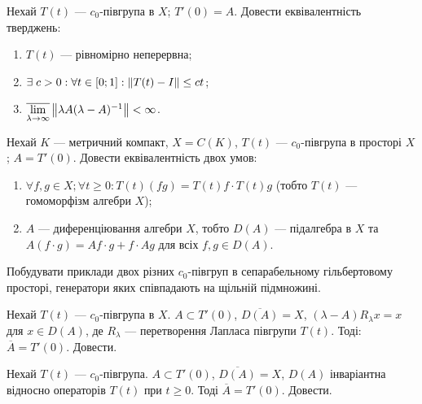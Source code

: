 
\begin{exercise}
    Нехай $T(t)$ --- $c_0$-півгрупа в $X$; $T'(0) = A$. Довести еквівалентність тверджень:
    \begin{enumerate}
        \item $T(t)$ --- рівномірно неперервна;
        \item $\exists \; c > 0: \forall t \in [0; 1]: \left\lVert T(t) - I\right\rVert \leq ct$;
        \item $\overline{\lim\limits_{\lambda \rightarrow \infty}} \left\lVert\lambda A (\lambda - A)^{-1}\right\rVert < \infty$.
    \end{enumerate}
\end{exercise}

\begin{exercise}
    Нехай $K$ --- метричний компакт, $X = C(K)$, $T(t)$ --- $c_0$-півгрупа в просторі $X$; 
    $A = T'(0)$. Довести еквівалентність двох умов:
    \begin{enumerate}
        \item $\forall f, g \in X; \forall t \geq 0: T(t)(fg) = T(t)f \cdot T(t)g$
        (тобто $T(t)$ --- гомоморфізм алгебри $X$);
        \item $A$ --- диференціювання алгебри $X$, тобто $D(A)$ --- підалгебра в $X$
        та $A(f \cdot g) = Af \cdot g + f \cdot Ag$ для всіх $f, g \in D(A)$.
    \end{enumerate}
\end{exercise}

\begin{exercise}
    Побудувати приклади двох різних $c_0$-півгруп в сепарабельному гільбертовому просторі, 
    генератори яких співпадають на щільній підмножині.
\end{exercise}

\begin{exercise}
    Нехай $T(t)$ --- $c_0$-півгрупа в $X$. $A \subset T' (0)$, $\overline{D(A)} = X$, 
    $(\lambda - A)R_{\lambda}x = x$ для $x \in D(A)$, де $R_{\lambda}$ --- перетворення Лапласа півгрупи $T(t)$.
    Тоді: $\overline{A} = T'(0)$. Довести.
\end{exercise}

\begin{exercise}
    Нехай $T(t)$ --- $c_0$-півгрупа. $A \subset T'(0)$, $\overline{D(A)} = X$, 
    $D(A)$ інваріантна відносно операторів $T(t)$ при $t \geq 0$. Тоді $\overline{A} = T'(0)$. Довести.
\end{exercise}